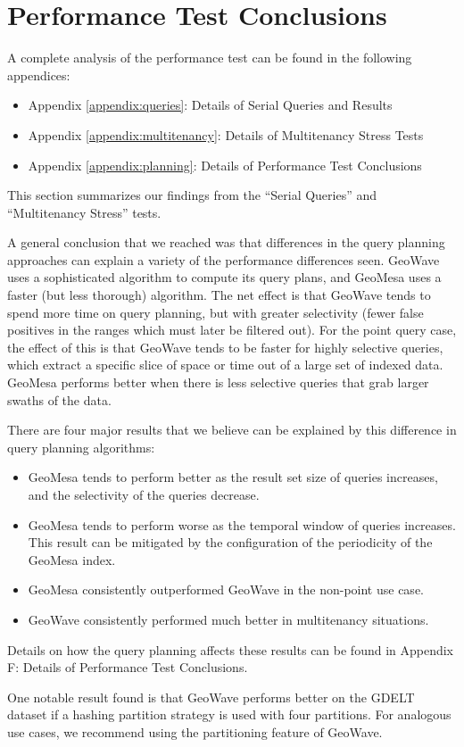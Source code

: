 \section{Performance Test Conclusions}
\label{sec:results}

A complete analysis of the performance test can be found in the following appendices:

\begin{itemize}
\item Appendix \ref{appendix:queries}: Details of Serial Queries and Results
\item Appendix \ref{appendix:multitenancy}: Details of Multitenancy Stress Tests
\item Appendix \ref{appendix:planning}: Details of Performance Test Conclusions
\end{itemize}

This section summarizes our findings from the ``Serial Queries'' and ``Multitenancy Stress'' tests.

A general conclusion that we reached was that differences in the query planning approaches can explain a variety of the performance differences seen. GeoWave uses a sophisticated algorithm to compute its query plans, and GeoMesa uses a faster (but less thorough) algorithm. The net effect is that GeoWave tends to spend more time on query planning, but with greater selectivity (fewer false positives in the ranges which must later be filtered out). For the point query case, the effect of this is that GeoWave tends to be faster for highly selective queries, which extract a specific slice of space or time out of a large set of indexed data. GeoMesa performs better when there is less selective queries that grab larger swaths of the data. 

There are four major results that we believe can be explained by this difference in query planning algorithms:

\begin{itemize}
\item GeoMesa tends to perform better as the result set size of queries increases, and the selectivity of the queries decrease.
\item GeoMesa tends to perform worse as the temporal window of queries increases. This result can be mitigated by the configuration of the periodicity of the GeoMesa index.
\item GeoMesa consistently outperformed GeoWave in the non-point use case.
\item GeoWave consistently performed much better in multitenancy situations.
\end{itemize}

Details on how the query planning affects these results can be found in Appendix F: Details of Performance Test Conclusions.

One notable result found is that GeoWave performs better on the GDELT dataset if a hashing partition strategy is used with four partitions. For analogous use cases, we recommend using the partitioning feature of GeoWave.
